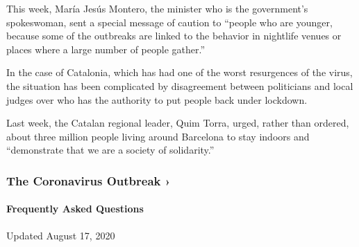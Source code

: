This week, María Jesús Montero, the minister who is the government's
spokeswoman, sent a special message of caution to ``people who are
younger, because some of the outbreaks are linked to the behavior in
nightlife venues or places where a large number of people gather.''

In the case of Catalonia, which has had one of the worst resurgences of
the virus, the situation has been complicated by disagreement between
politicians and local judges over who has the authority to put people
back under lockdown.

Last week, the Catalan regional leader, Quim Torra, urged, rather than
ordered, about three million people living around Barcelona to stay
indoors and ``demonstrate that we are a society of solidarity.''

\href{https://www.nytimes3xbfgragh.onion/news-event/coronavirus?action=click\&pgtype=Article\&state=default\&region=MAIN_CONTENT_3\&context=storylines_faq}{}

\hypertarget{the-coronavirus-outbreak-}{%
\subsubsection{The Coronavirus Outbreak
›}\label{the-coronavirus-outbreak-}}

\hypertarget{frequently-asked-questions}{%
\paragraph{Frequently Asked
Questions}\label{frequently-asked-questions}}

Updated August 17, 2020


